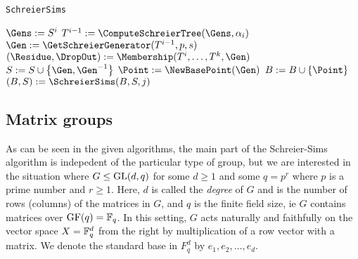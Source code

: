 \begin{algorithm} 
\dontprintsemicolon
\caption{\texttt{SchreierSims}}



\Begin
{
  $\Gens := S^i$ \;
  $T^{i - 1} := \ComputeSchreierTree(\Gens, \alpha_i)$ \; \label{alg:ss_comp_tree}
  {
    {
      $\Gen := \GetSchreierGenerator(T^{i - 1}, p, s)$ \;
      {
        $(\Residue, \DropOut) := \Membership(T^i, \dotsc, T^k, \Gen)$ \;
        {
          $S := S \cup \set{\Gen, \Gen^{-1}}$ \;
          {
            $\Point := \NewBasePoint(\Gen)$ \;
            $B := B \cup \set{\Point}$ \;
          }
          {
            $(B, S) := \SchreierSims(B, S, j)$ \;
          }
        }
      }    
    }
  }
}
\label{alg:ss}
\end{algorithm}

\subsection{Matrix groups}
As can be seen in the given algorithms, the main part of the
Schreier-Sims algorithm is indepedent of the particular type of group,
but we are interested in the situation where $G \leq \operatorname{GL}(d, q)$ for
some $d \geq 1$ and some $q = p^r$ where $p$ is a prime number and $r
\geq 1$. Here, $d$ is called the \emph{degree} of $G$ and is the
number of rows (columns) of the matrices in $G$, and $q$ is the finite
field size, ie $G$ contains matrices over $\operatorname{GF}(q) = \mathbb{F}_q$. In this
setting, $G$ acts naturally and faithfully on the vector space $X = \mathbb{F}_q^d$ from the
right by multiplication of a row vector with a matrix. We denote the standard base in $F_q^d$ by $e_1, e_2, \dotsc, e_d$.

